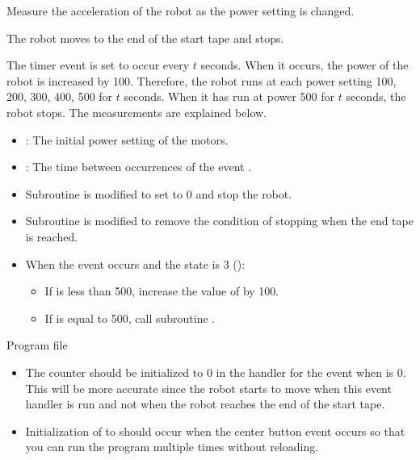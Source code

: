 \pagebreak[4]


Measure the acceleration of the robot as the power setting is changed.


The robot moves to the end of the start tape and stops.

The timer event  is set to occur every $t$ seconds. When it
occurs, the power of the robot is increased by 100. Therefore, the robot
runs at each power setting 100, 200, 300, 400, 500 for $t$ seconds. When
it has run at power 500 for $t$ seconds, the robot stops. The
measurements are explained below.


\begin{itemize}
\item {}: The initial power setting of the motors.

\item {}: The time between occurrences of the event .  
\end{itemize}


\begin{itemize}

\item Subroutine  is modified to set
 to 0 and stop the robot.

\item Subroutine  is modified to remove the condition
of stopping when the end tape is reached.

\item When the  event occurs and the state is 3
():
\begin{itemize}
\item If  is less than 500, increase the value of  by 100.
\item If  is equal to 500, call subroutine .
\end{itemize}


\end{itemize}


{\raggedleft \hfill Program file }

\begin{itemize}

\item The counter  should be initialized to 0 in the
handler for the  event when  is 0. This will be more
accurate since the robot starts to move when this event handler is run
and not when the robot reaches the end of the start tape.

\item Initialization of  to  should occur when the
center button event occurs so that you can run the program multiple
times without reloading.

\end{itemize}

